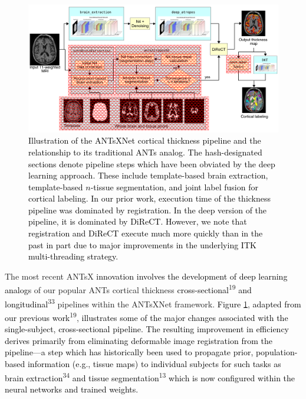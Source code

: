 \documentclass[12pt,]{article}
\begin{document}
\begin{figure}[htb]
  \centering
    \includegraphics[width=\textwidth]{Figures/antsxnetPipeline.pdf}
  \caption{\textcolor{black}{Illustration of the ANTsXNet cortical thickness pipeline and the
  relationship to its traditional ANTs analog.  The hash-designated sections
  denote pipeline steps which have been obviated by the deep learning approach.
  These include template-based brain extraction, template-based $n$-tissue
  segmentation, and joint label fusion for cortical labeling.  In our prior work, execution time of the thickness pipeline was dominated by registration.  In the deep version of the pipeline,
it is dominated by DiReCT.  However, we note that  registration and DiReCT execute much more quickly than in the past in part due to major improvements in the underlying ITK multi-threading strategy.}}
  \label{fig:pipeline}
\end{figure}

The most recent ANTsX
\textcolor{black}{innovation involves the development of
deep learning analogs} of our popular ANTs cortical thickness
\textcolor{black}{cross-sectional}\textsuperscript{19}
\textcolor{black}{and
longitudinal}\textsuperscript{33} pipeline\textcolor{black}{s} within
the ANTsXNet framework. \textcolor{black}{Figure} \ref{fig:pipeline},
\textcolor{black}{adapted from our previous work}\textsuperscript{19},
\textcolor{black}{illustrates some of the major changes associated with the
single-subject, cross-sectional pipeline.  The resulting improvement in efficiency
derives primarily from eliminating deformable image registration from the
pipeline---a step which has historically been used to propagate prior,
population-based information (e.g., tissue maps) to individual subjects for such
tasks as brain extraction}\textsuperscript{34}
\textcolor{black}{and tissue
segmentation}\textsuperscript{13}
\textcolor{black}{which is now configured within
the neural networks and trained weights.}
\end{document}
